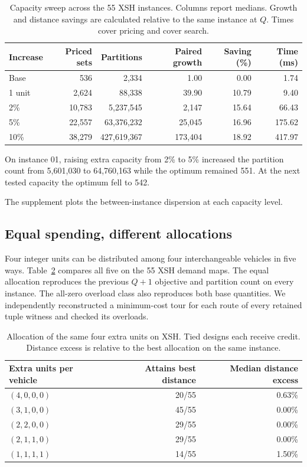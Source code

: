 \documentclass[runningheads]{llncs}
\begin{document}
\begin{table}[tb]\centering
\caption{Capacity sweep across the 55 XSH instances. Columns report medians. Growth and distance savings are calculated relative to the same instance at $Q$. Times cover pricing and cover search.}\label{tab:sweep}
\begin{tabular}{lrrrrr}\toprule
Increase & Priced sets & Partitions & Paired growth & Saving (\%) & Time (ms)\\\midrule
Base &536&2,334&1.00&0.00&1.74\\
1 unit &2,624&88,338&39.90&10.79&9.40\\
2\% &10,783&5,237,545&2,147&15.64&66.43\\
5\% &22,557&63,376,232&25,045&16.96&175.62\\
10\% &38,279&427,619,367&173,404&18.92&417.97\\\bottomrule
\end{tabular}
\end{table}

On instance 01, raising extra capacity from 2\% to 5\% increased the partition count from 5,601,030 to 64,760,163 while the optimum remained 551. At the next tested capacity the optimum fell to 542.

The supplement plots the between-instance dispersion at each capacity level.


\subsection{Equal spending, different allocations}
Four integer units can be distributed among four interchangeable vehicles in five ways. Table~\ref{tab:allocation} compares all five on the 55 XSH demand maps. The equal allocation reproduces the previous $Q+1$ objective and partition count on every instance. The all-zero overload class also reproduces both base quantities. We independently reconstructed a minimum-cost tour for each route of every retained tuple witness and checked its overloads.

\begin{table}[tb]\centering
\caption{Allocation of the same four extra units on XSH. Tied designs each receive credit. Distance excess is relative to the best allocation on the same instance.}\label{tab:allocation}
\begin{tabular}{lrr}\toprule
Extra units per vehicle & Attains best distance & Median distance excess\\\midrule
$(4,0,0,0)$ & 20/55 & 0.63\%\\
$(3,1,0,0)$ & 45/55 & 0.00\%\\
$(2,2,0,0)$ & 29/55 & 0.00\%\\
$(2,1,1,0)$ & 29/55 & 0.00\%\\
$(1,1,1,1)$ & 14/55 & 1.50\%\\\bottomrule
\end{tabular}
\end{table}
\end{document}
